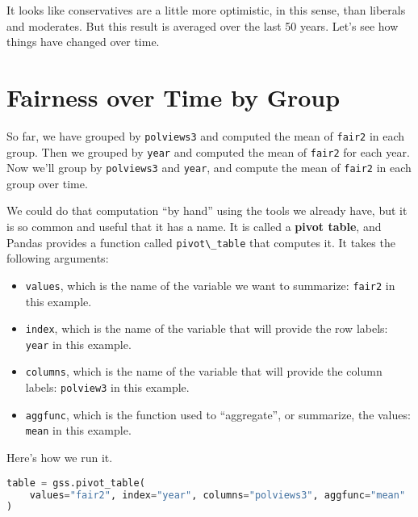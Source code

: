 It looks like conservatives are a little more optimistic, in this sense,
than liberals and moderates. But this result is averaged over the last
50 years. Let's see how things have changed over time.

\hypertarget{fairness-over-time-by-group}{%
\section{Fairness over Time by
Group}\label{fairness-over-time-by-group}}

So far, we have grouped by \passthrough{\lstinline!polviews3!} and
computed the mean of \passthrough{\lstinline!fair2!} in each group. Then
we grouped by \passthrough{\lstinline!year!} and computed the mean of
\passthrough{\lstinline!fair2!} for each year. Now we'll group by
\passthrough{\lstinline!polviews3!} and \passthrough{\lstinline!year!},
and compute the mean of \passthrough{\lstinline!fair2!} in each group
over time.

We could do that computation ``by hand'' using the tools we already
have, but it is so common and useful that it has a name. It is called a
\textbf{pivot table}, and Pandas provides a function called
\passthrough{\lstinline!pivot\_table!} that computes it. It takes the
following arguments:

\begin{itemize}
\item
  \passthrough{\lstinline!values!}, which is the name of the variable we
  want to summarize: \passthrough{\lstinline!fair2!} in this example.
\item
  \passthrough{\lstinline!index!}, which is the name of the variable
  that will provide the row labels: \passthrough{\lstinline!year!} in
  this example.
\item
  \passthrough{\lstinline!columns!}, which is the name of the variable
  that will provide the column labels:
  \passthrough{\lstinline!polview3!} in this example.
\item
  \passthrough{\lstinline!aggfunc!}, which is the function used to
  ``aggregate'', or summarize, the values:
  \passthrough{\lstinline!mean!} in this example.
\end{itemize}

Here's how we run it.

\begin{lstlisting}[language=Python,style=source]
table = gss.pivot_table(
    values="fair2", index="year", columns="polviews3", aggfunc="mean"
)
\end{lstlisting}

